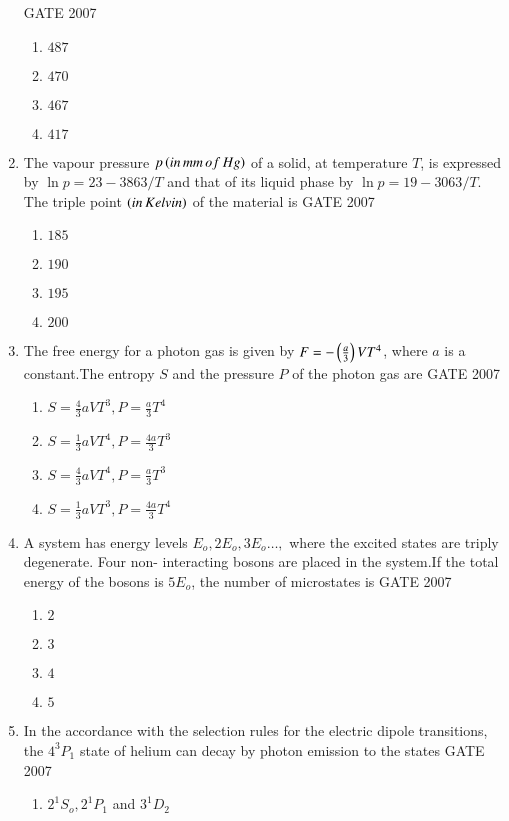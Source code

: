 \documentclass[journal]{IEEEtran}
\begin{document}
\begin{enumerate}
\hfill{GATE 2007}\begin{enumerate}
    \item $487$
    \item $470$
    \item $467$
    \item $417$
\end{enumerate}
\item The vapour pressure $p\left(in \, mm \, of \,Hg\right)$ of a solid, at temperature $T$, is expressed by $\ln{p}=23-3863/T$ and that of its liquid phase by $\ln{p}= 19-3063/T$. The triple point $\left(in \, Kelvin\right)$ of the material is 
\hfill{GATE 2007}\begin{enumerate}
    \item $185$
    \item $190$
    \item $195$
    \item $200$
\end{enumerate}
\item The free energy for a photon gas is given by $F = -\left(\frac{a}{3}\right)VT^4$, where $a$ is a constant.The entropy $S$ and the pressure $P$ of the photon gas are 
\hfill{GATE 2007}\begin{enumerate}
    \item $S=\frac{4}{3}aVT^3, P=\frac{a}{3}T^4$
    \item $S=\frac{1}{3}aVT^4, P=\frac{4a}{3}T^3$
    \item $S=\frac{4}{3}aVT^4, P=\frac{a}{3}T^3$
    \item $S=\frac{1}{3}aVT^3, P=\frac{4a}{3}T^4$
\end{enumerate}
\item A system has energy levels $E_o,2E_o,3E_o\dots,$ where the excited states are triply degenerate. Four non- interacting bosons are placed in the system.If the total energy of the bosons is $5E_o$, the number of microstates is \hfill{GATE 2007}
\begin{enumerate}
    \item $2$
    \item $3$
    \item $4$
    \item $5$
\end{enumerate}
\item In the accordance with the selection rules for the electric dipole transitions, the $4^3P_1$ state of helium can decay by photon emission to the states 
\hfill{GATE 2007}\begin{enumerate}
    \item $2^1S_o,2^1P_1$ and $3^1D_2$

\end{enumerate}
\end{enumerate}
\end{document}
